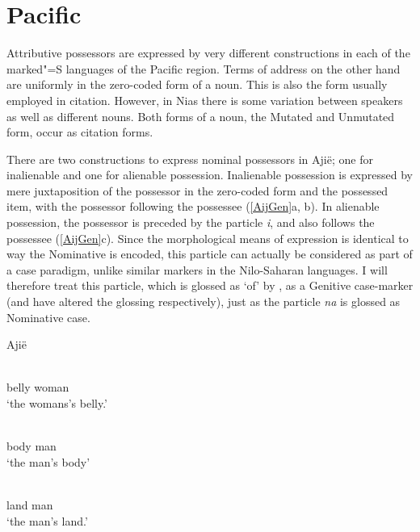 \section{Pacific}\label{ExtraPac}

Attributive possessors are expressed by very different constructions in each of the marked"=S languages of the Pacific region.
Terms of address on the other hand are uniformly in the zero-coded form of a noun.
This is also the form usually employed in citation. 
However, in Nias there is some variation between speakers as well as different nouns.
Both forms of a noun, the Mutated and Unmutated form, occur as citation forms.
 


There are two constructions to express nominal possessors in Aji\"e; one for inalienable and one for alienable possession.
Inalienable possession is expressed by mere juxtaposition of the possessor in the zero-coded form and the possessed item, with the possessor following the possessee (\ref{AijGen}a, b). In alienable possession, the possessor is preceded by the particle \emph{i}, and also follows the possessee (\ref{AijGen}c).
Since the morphological means of expression is identical to way the Nominative is encoded, this particle can actually be considered as part of a case paradigm, unlike similar markers in the Nilo-Saharan languages. 
I will therefore treat this particle, which is glossed as `of' by \citet{Lichtenberk:1978}, as a Genitive case-marker (and have altered the glossing respectively), just as the particle \emph{na} is glossed as Nominative case. 

\pagebreak
\begin{exe}\ex\label{AijGen} {Aji\"e} \citep[Oceanic; New Caledonia; ][85, 86]{Lichtenberk:1978}\nopagebreak[4]
\begin{xlist}
\ex\gll{} \textbf{}\\
belly woman\\
`the womans's belly.' %

\ex\gll{} \textbf{}\\
body man\\
`the man's body' %

\ex\gll{} \textbf{} \\
land \gen{} man\\
`the man's land.' %
\end{xlist}
\end{exe}

